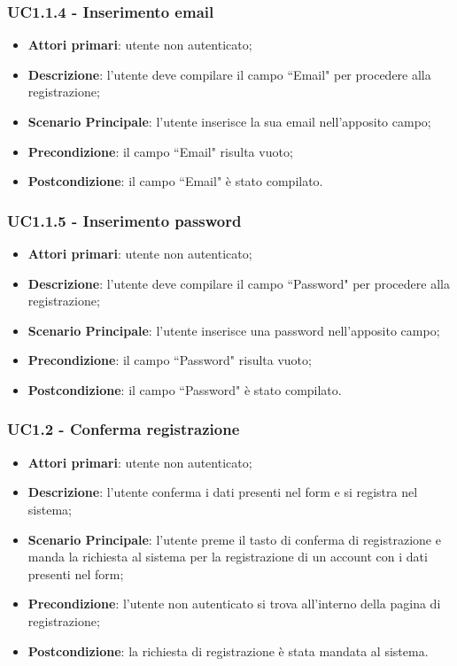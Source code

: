 \subsubsection{UC1.1.4 - Inserimento email}
\begin{itemize}
\item \textbf{Attori primari}: utente non autenticato;
\item \textbf{Descrizione}: l'utente deve compilare il campo ``Email" per procedere alla registrazione;
\item \textbf{Scenario Principale}: l'utente inserisce la sua email nell'apposito campo;
\item \textbf{Precondizione}: il campo ``Email" risulta vuoto;
\item \textbf{Postcondizione}: il campo ``Email" è stato compilato.
\end{itemize}

\subsubsection{UC1.1.5 - Inserimento password}
\begin{itemize}
\item \textbf{Attori primari}: utente non autenticato;
\item \textbf{Descrizione}: l'utente deve compilare il campo ``Password" per procedere alla registrazione;
\item \textbf{Scenario Principale}: l'utente inserisce una password nell'apposito campo;
\item \textbf{Precondizione}: il campo ``Password" risulta vuoto;
\item \textbf{Postcondizione}: il campo ``Password" è stato compilato.
\end{itemize}

\subsubsection{UC1.2 - Conferma registrazione}
\begin{itemize}
\item \textbf{Attori primari}: utente non autenticato;
\item \textbf{Descrizione}: l'utente conferma i dati presenti nel form e si registra nel sistema;
\item \textbf{Scenario Principale}: l'utente preme il tasto di conferma di registrazione e manda la richiesta al sistema per la registrazione di un account con i dati presenti nel form;
\item \textbf{Precondizione}: l'utente non autenticato si trova all'interno della pagina di registrazione;
\item \textbf{Postcondizione}: la richiesta di registrazione è stata mandata al sistema.
\end{itemize}

